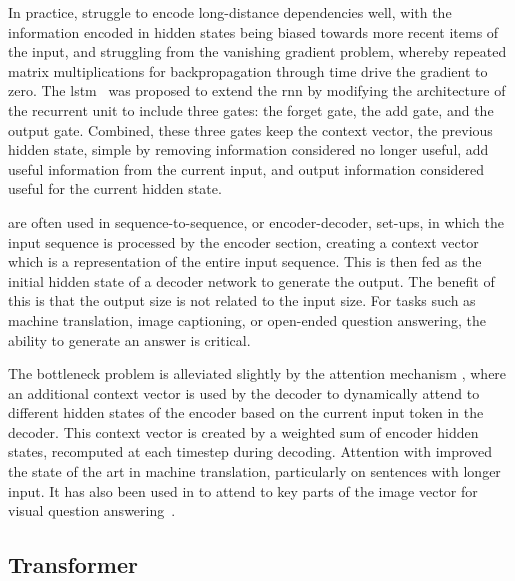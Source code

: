 In practice,  struggle to encode long-distance dependencies
well, with the information encoded in hidden states being biased towards more
recent items of the input, and struggling from the vanishing gradient problem,
whereby repeated matrix multiplications for backpropagation through time drive
the gradient to zero. The \acrfull{lstm}~\citep{hochreiter1997lstm} was
proposed to extend the \acrshort{rnn} by modifying the architecture of the
recurrent unit to include three gates: the forget gate, the add gate, and the
output gate. Combined, these three gates keep the context vector, the previous
hidden state, simple by removing information considered no longer useful, add
useful information from the current input, and output information considered
useful for the current hidden state.

 are often used in sequence-to-sequence, or encoder-decoder,
set-ups, in which the input sequence is processed by the encoder section,
creating a context vector which is a representation of the entire input
sequence. This is then fed as the initial hidden state of a decoder network to
generate the output. The benefit of this is that the output size is not related
to the input size. For tasks such as machine translation, image captioning, or
open-ended question answering, the ability to generate an answer is critical.

The bottleneck problem is alleviated slightly by the attention
mechanism \citep{bahdanau2015attention}, where an additional context vector is
used by the decoder to dynamically attend to different hidden states of the
encoder based on the current input token in the decoder. This context vector is
created by a weighted sum of encoder hidden states, recomputed at each timestep
during decoding. Attention with  improved the state of the art
in machine translation, particularly on sentences with longer input. It has
also been used in  to attend to key parts of the image vector for
visual question answering~\citep{yang2016san}.


\subsection{Transformer}
\label{ssec:transformer}

